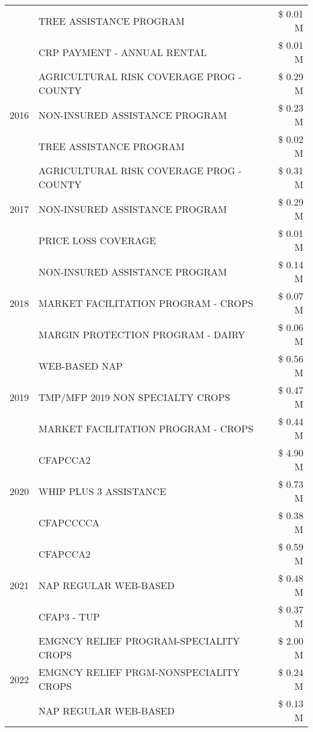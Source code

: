 \begin{tabular}{llr}
 & TREE ASSISTANCE PROGRAM & \$ 0.01 M \\
 & CRP PAYMENT - ANNUAL RENTAL & \$ 0.01 M \\
\cline{1-3}
\multirow[t]{3}{*}{2016} & AGRICULTURAL RISK COVERAGE PROG - COUNTY & \$ 0.29 M \\
 & NON-INSURED ASSISTANCE PROGRAM & \$ 0.23 M \\
 & TREE ASSISTANCE PROGRAM & \$ 0.02 M \\
\cline{1-3}
\multirow[t]{3}{*}{2017} & AGRICULTURAL RISK COVERAGE PROG - COUNTY & \$ 0.31 M \\
 & NON-INSURED ASSISTANCE PROGRAM & \$ 0.29 M \\
 & PRICE LOSS COVERAGE & \$ 0.01 M \\
\cline{1-3}
\multirow[t]{3}{*}{2018} & NON-INSURED ASSISTANCE PROGRAM & \$ 0.14 M \\
 & MARKET FACILITATION PROGRAM - CROPS & \$ 0.07 M \\
 & MARGIN PROTECTION PROGRAM - DAIRY & \$ 0.06 M \\
\cline{1-3}
\multirow[t]{3}{*}{2019} & WEB-BASED NAP & \$ 0.56 M \\
 & TMP/MFP 2019 NON SPECIALTY CROPS & \$ 0.47 M \\
 & MARKET FACILITATION PROGRAM - CROPS & \$ 0.44 M \\
\cline{1-3}
\multirow[t]{3}{*}{2020} & CFAPCCA2 & \$ 4.90 M \\
 & WHIP PLUS 3 ASSISTANCE & \$ 0.73 M \\
 & CFAPCCCCA & \$ 0.38 M \\
\cline{1-3}
\multirow[t]{3}{*}{2021} & CFAPCCA2 & \$ 0.59 M \\
 & NAP REGULAR WEB-BASED & \$ 0.48 M \\
 & CFAP3 - TUP & \$ 0.37 M \\
\cline{1-3}
\multirow[t]{3}{*}{2022} & EMGNCY RELIEF PROGRAM-SPECIALITY CROPS & \$ 2.00 M \\
 & EMGNCY RELIEF PRGM-NONSPECIALITY CROPS & \$ 0.24 M \\
 & NAP REGULAR WEB-BASED & \$ 0.13 M \\
\cline{1-3}
\bottomrule
\end{tabular}
